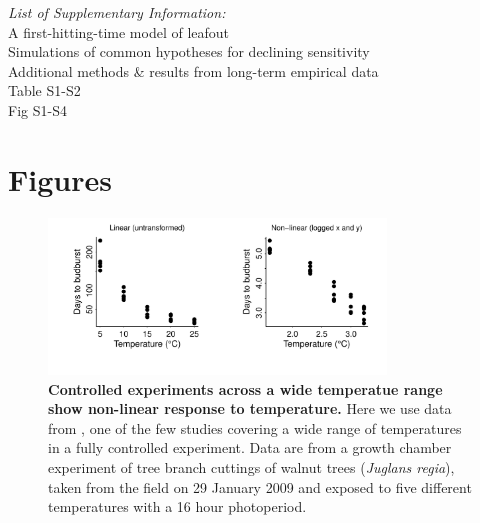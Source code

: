 \documentclass[11pt,letter]{article}
\begin{document}
\emph{List of Supplementary Information:}\\
A first-hitting-time model of leafout\\
Simulations of common hypotheses for declining sensitivity\\
Additional methods \& results from long-term empirical data\\
Table S1-S2\\
Fig S1-S4\\

\newpage
\section* {Figures}



\begin{figure}[h!]
\centering
\noindent \includegraphics[width=0.8\textwidth]{..//analyses/figures/ospreeforcems.pdf}
\caption{\textbf{Controlled experiments across a wide temperatue range show non-linear response to temperature.} Here we use data from \citet{Charrier:2011aa}, one of the few studies covering a wide range of temperatures in a fully controlled experiment. Data are from a growth chamber experiment of tree branch cuttings of  walnut trees (\emph{Juglans regia}), taken from the field on 29 January 2009 and exposed to five different temperatures with a 16 hour photoperiod.} 
\label{fig:ospreewsims} %
\end{figure}
\end{document}
